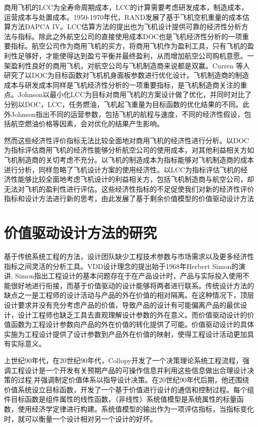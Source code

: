 \documentclass[12pt,a4paper]{report}
\begin{document}
商用飞机的LCC为全寿命周期成本，LCC的计算需要考虑研发成本，制造成本，运营成本与处置成本。1950-1970年代，RAND发展了基于飞机空机重量的成本估算方法DAPCA IV。LCC估算方法的提出也为飞机设计提供可靠的经济性分析方法与指标。除此之外航空公司的直接使用成本DOC也是飞机经济性分析的一项重要指标。航空公司作为商用飞机的买方，将商用飞机作为盈利工具，只有飞机的盈利性足够好，才能使得达到盈亏平衡并最终盈利，从而增加航空公司购机意愿。一架盈利性良好的商用飞机，对航空公司与飞机制造商来说都是双赢。Curren 等人研究了以DOC为目标函数对飞机机身面板参数进行优化设计。飞机制造商的制造成本与研发成本同样是飞机经济性分析的一项重要指标，是飞机制造商关注的重点。Johnson以最小化LCC为目标对商用飞机的方案设计做了优化，并同时对比了分别以DOC，LCC，任务燃油，飞机起飞重量为目标函数的优化结果的不同。此外Johnson指出不同的运营参数，包括飞机的航程与速度，不同的经济性假设，包括航空燃油价格等因素，会对优化的结果产生影响。

然而这些经济性评价指标无法比较全面地对商用飞机的经济性进行分析。以DOC为指标评估商用飞机的经济性能够分析航空公司的使用成本，对其他利益相关方如飞机制造商的关切考虑不充分。以飞机的制造成本为指标能够对飞机制造商的成本进行分析，同样忽略了飞机设计方案的使用经济性。以LCC为指标评估飞机的经济性能够比较全面地考虑飞机设计的利益相关方，包括飞机制造商与航空公司，却无法对飞机的盈利性进行评估。这些经济性指标的不足促使我们对新的经济性评价指标和设计方法进行新的思考，由此发展了基于剩余价值模型的价值驱动设计方法

\section{价值驱动设计方法的研究}
基于传统系统工程的方法，设计团队缺少工程技术参数与市场需求以及更多经济性指标之间灵活的分析工具。VDD设计理念的提出始于1968年Herbert Simon的演讲, Simon指出工程设计的基本问题存在于在产品设计时，产品与实际投入使用不能很好地进行衔接，而基于价值驱动的设计能够将两者进行联系。传统设计方法的缺点之一是工程师的设计活动与产品的外在价值的相对隔离。在这种情况下，顶层设计要求并没有充分考虑产品的价值，导致产品的设计有可能偏离产品的最优设计，设计工程师也缺乏工具去直观理解设计参数的外在意义。而价值驱动设计的价值函数为工程设计参数向产品的外在价值的转化提供了可能。价值驱动设计的具体实施为工程设计提供了设计参数到产品外在价值的映射，使得工程设计活动更加具有实际意义。

上世纪90年代，在20世纪90年代，Collopy开发了一个决策理论系统工程流程，强调工程设计是一个开发有关预期产品的可操作信息并利用这些信息做出合理设计决策的过程,并强调制定价值体系以指导设计决策。在20世纪90年代后期，他还围绕价值系统设立目标函数，开发了一个基于价值进行设计的通信和控制过程。每个组件目标函数是组件属性的线性函数，（非线性）系统值模型是系统属性的标量函数，使用经济学定律进行构建。系统值模型的输出作为一项评估指标，当指标变化时，就可以衡量一个设计相对另一个设计的好坏。
\end{document}
